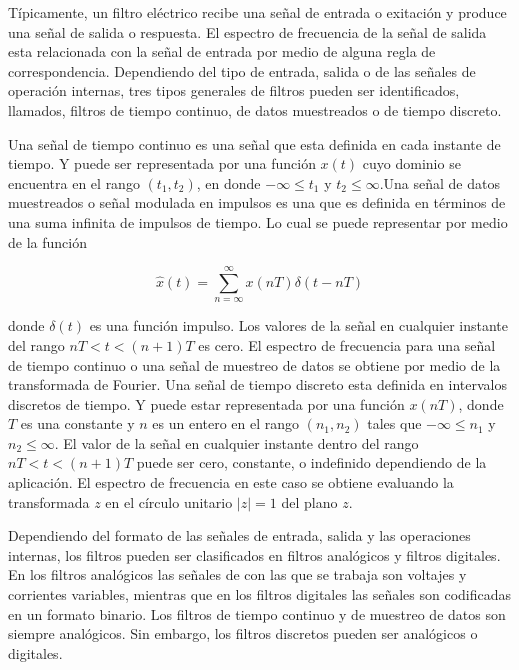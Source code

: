 \documentclass[12pt]{book}
\theoremstyle{definition}
\theoremstyle{remark}
\theoremstyle{plain}
\begin{document}
Típicamente, un filtro eléctrico recibe una señal de entrada o exitación y produce una señal de salida o respuesta. El espectro de frecuencia de la señal de salida esta relacionada con la señal de entrada por medio de alguna regla de correspondencia. Dependiendo del tipo de entrada, salida o de las señales de operación internas, tres tipos generales de filtros pueden ser identificados, llamados, filtros de tiempo continuo, de datos muestreados o de tiempo discreto.

Una señal de tiempo continuo es una señal que esta definida en cada instante de tiempo. Y puede ser representada por una función $x(t)$ cuyo dominio se encuentra en el rango $(t_1,t_2)$, en donde $- \infty \leq t_1$ y $t_2 \leq \infty$.Una señal de datos muestreados o señal modulada en impulsos es una que es definida en términos de una suma infinita de impulsos de tiempo. Lo cual se puede representar por medio de la función

\begin{equation}
\label{equ27}
\widehat{x}(t) = \sum_{n= \infty}^{\infty} x(n T) \delta (t-n T)
\end{equation}

donde $\delta (t)$ es una función impulso. Los valores de la señal en cualquier instante del rango $n T<t <(n+1)T$ es cero. El espectro de frecuencia para una señal de tiempo continuo o una señal de muestreo de datos se obtiene por medio de la transformada de Fourier.
 Una señal de tiempo discreto esta definida en intervalos discretos de tiempo. Y puede estar representada por una función $x(n T)$, donde $T$ es una constante y $n$ es un entero en el rango $(n_1,n_2)$ tales que $- \infty \leq n_1$ y $n_2 \leq \infty$. El valor de la señal en cualquier instante dentro del rango $n T <t<(n+1) T$ puede ser cero, constante, o indefinido dependiendo de la aplicación. El espectro de frecuencia en este caso se obtiene evaluando la transformada $z$ en el círculo unitario $\mid z \mid=1$ del plano $z$.

Dependiendo del formato de las señales de entrada, salida y las operaciones internas, los filtros pueden ser clasificados en filtros analógicos y filtros digitales. En los filtros analógicos las señales de con las que se trabaja son voltajes y corrientes variables, mientras que en los filtros digitales las señales son codificadas en un formato binario. Los filtros de tiempo continuo y de muestreo de datos son siempre analógicos. Sin embargo, los filtros discretos pueden ser analógicos o digitales.
\end{document}
